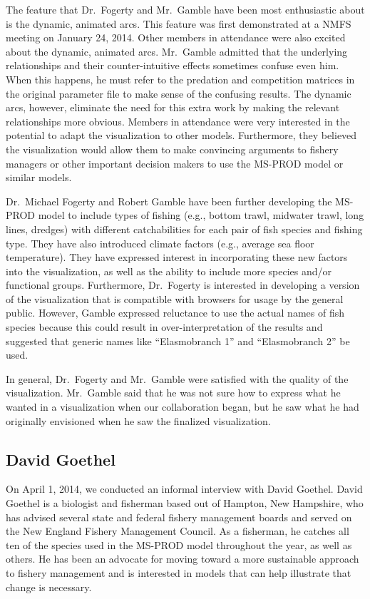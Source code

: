 The feature that Dr.\ Fogerty and Mr.\ Gamble have been most enthusiastic about is the dynamic, animated arcs.  This feature was first demonstrated at a NMFS meeting on January 24, 2014.  Other members in attendance were also excited about the dynamic, animated arcs.  Mr.\ Gamble admitted that the underlying relationships and their counter-intuitive effects sometimes confuse even him.  When this happens, he must refer to the predation and competition matrices in the original parameter file to make sense of the confusing results.  The dynamic arcs, however, eliminate the need for this extra work by making the relevant relationships more obvious.  Members in attendance were very interested in the potential to adapt the visualization to other models.  Furthermore, they believed the visualization would allow them to make convincing arguments to fishery managers or other important decision makers to use the MS-PROD model or similar models.

Dr.\ Michael Fogerty and Robert Gamble have been further developing the MS-PROD model to include types of fishing (e.g., bottom trawl, midwater trawl, long lines, dredges) with different catchabilities for each pair of fish species and fishing type.  They have also introduced climate factors (e.g., average sea floor temperature).  They have expressed interest in incorporating these new factors into the visualization, as well as the ability to include more species and/or functional groups.  Furthermore, Dr.\ Fogerty is interested in developing a version of the visualization that is compatible with browsers for usage by the general public.  However, Gamble expressed reluctance to use the actual names of fish species because this could result in over-interpretation of the results and suggested that generic names like ``Elasmobranch 1'' and ``Elasmobranch 2'' be used.

In general, Dr.\ Fogerty and Mr.\ Gamble were satisfied with the quality of the visualization.  Mr.\ Gamble said that he was not sure how to express what he wanted in a visualization when our collaboration began, but he saw what he had originally envisioned when he saw the finalized visualization.  

\subsection{David Goethel}

On April 1, 2014, we conducted an informal interview with David Goethel.  David Goethel is a biologist and fisherman based out of Hampton, New Hampshire, who has advised several state and federal fishery management boards and served on the New England Fishery Management Council.  As a fisherman, he catches all ten of the species used in the MS-PROD model throughout the year, as well as others.  He has been an advocate for moving toward a more sustainable approach to fishery management and is interested in models that can help illustrate that change is necessary.  

